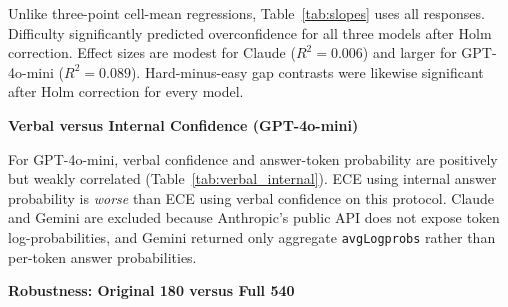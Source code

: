 \documentclass[twoside,twocolumn,10pt]{article}
\begin{document}
Unlike three-point cell-mean regressions, Table~\ref{tab:slopes} uses all responses. Difficulty significantly predicted overconfidence for all three models after Holm correction. Effect sizes are modest for Claude ($R^2 = 0.006$) and larger for GPT-4o-mini ($R^2 = 0.089$). Hard-minus-easy gap contrasts were likewise significant after Holm correction for every model.

\textbf{Verbal versus Internal Confidence (GPT-4o-mini)}

\begin{table}[!htbp]
\centering
\caption{Verbal versus answer-token internal probability (GPT-4o-mini only).}
\label{tab:verbal_internal}
\end{table}

For GPT-4o-mini, verbal confidence and answer-token probability are positively but weakly correlated (Table~\ref{tab:verbal_internal}). ECE using internal answer probability is \emph{worse} than ECE using verbal confidence on this protocol. Claude and Gemini are excluded because Anthropic's public API does not expose token log-probabilities, and Gemini returned only aggregate \texttt{avgLogprobs} rather than per-token answer probabilities.

\textbf{Robustness: Original 180 versus Full 540}

\begin{table}[!htbp]
\centering
\caption{Original-180 subset versus full-540 bank (accuracy / gap / ECE).}
\label{tab:robust}
\end{table}
\end{document}
